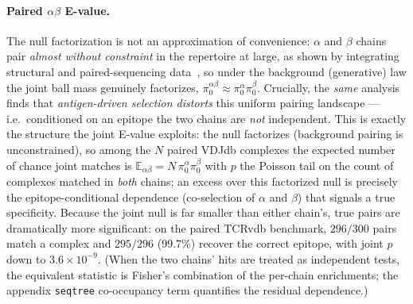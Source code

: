 \documentclass[11pt]{article}
\theoremstyle{oldplain}
\theoremstyle{oldrem}
\newcommand{\E}{\mathbb{E}}
\begin{document}
\paragraph{Paired $\alpha\beta$ E-value.} The null factorization is not an approximation of
convenience: $\alpha$ and $\beta$ chains pair \emph{almost without constraint} in the repertoire at
large, as shown by integrating structural and paired-sequencing data~\cite{Shcherbinin2020}, so under
the background (generative) law the joint ball mass genuinely factorizes,
$\pi_0^{\alpha\beta}\approx\pi_0^\alpha\pi_0^\beta$. Crucially, the \emph{same} analysis finds that
\emph{antigen-driven selection distorts} this uniform pairing landscape --- i.e.\ conditioned on an
epitope the two chains are \emph{not} independent. This is exactly the structure the joint E-value
exploits: the null factorizes (background pairing is unconstrained), so among the $N$ paired VDJdb
complexes the expected number of chance joint matches is $\E_{\alpha\beta}=N\,\pi_0^\alpha\pi_0^\beta$
with $p$ the Poisson tail on the count of complexes matched in \emph{both} chains; an excess over this
factorized null is precisely the epitope-conditional dependence (co-selection of $\alpha$ and $\beta$)
that signals a true specificity. Because the joint null is far smaller than either chain's, true pairs
are dramatically more significant: on the paired TCRvdb benchmark, $296/300$ pairs match a complex and
$295/296$ ($99.7\%$) recover the correct epitope, with joint $p$ down to $3.6\times10^{-9}$. (When the
two chains' hits are treated as independent tests, the equivalent statistic is Fisher's combination of
the per-chain enrichments; the appendix \texttt{seqtree} co-occupancy term quantifies the residual
dependence.)
\end{document}
